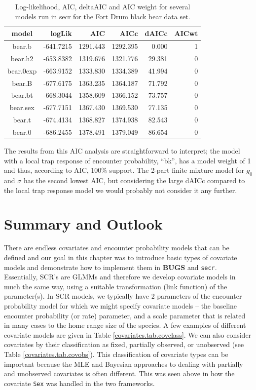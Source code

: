 \begin{table}[ht]
\centering
\caption{Log-likelihood, AIC, deltaAIC and AIC weight for several models run in secr for the Fort Drum black bear data set.}
\begin{tabular}{crrrrr}
\hline \hline
model     &  logLik   &   AIC    &   AICc   & dAICc  & AICwt \\ \hline
bear.b    & -641.7215 & 1291.443 & 1292.395 & 0.000  &  1 \\
bear.h2   & -653.8382 & 1319.676 & 1321.776 & 29.381 &  0 \\
bear.0exp & -663.9152 & 1333.830 & 1334.389 & 41.994 &  0 \\
bear.B    & -677.6175 & 1363.235 & 1364.187 & 71.792 &  0 \\
bear.bt   & -668.3044 & 1358.609 & 1366.152 & 73.757 &  0 \\
bear.sex  & -677.7151 & 1367.430 & 1369.530 & 77.135 &  0 \\
bear.t    & -674.4134 & 1368.827 & 1374.938 & 82.543 &  0 \\
bear.0    & -686.2455 & 1378.491 & 1379.049 & 86.654 &  0 \\ \hline
\end{tabular}
\label{covariates.tab.secrAIC}
\end{table}


The results from this AIC analysis are straightforward to interpret; the model
with a local trap response of encounter probability, ``bk'', has a model weight of 1 and thus, according to AIC, 100\% support.
The 2-part finite mixture model for $g_0$ and $\sigma$ has the second lowest
AIC, but considering the large dAICc compared to the local trap response model we would probably not consider it any further.  


\section{Summary and Outlook}

There are endless covariates and encounter probability models that can
be defined and our goal in this chapter was to introduce basic types
of covariate models and demonstrate how to implement them in {\bf
  BUGS} and \mbox{\tt secr}.  Essentially, SCR's are GLMMs and
therefore we develop covariate models in much the same way, using a
suitable transformation (link function) of the parameter(s). In SCR
models, we typically have 2 parameters of the encounter probability
model for which we might specify covariate models -- the baseline
encounter probability (or rate) parameter, and a scale parameter that
is related in many cases to the home range size of the species.  A few
examples of different covariate models are given in Table
\ref{covariates.tab.covclass}.  We can also consider covariates by
their classification as fixed, partially observed, or unobserved (see
Table \ref{covariates.tab.covobs}). This classification of covariate
types can be important because the MLE and Bayesian approaches to
dealing with partially and unobserved covariates is often different.
This was seen above in how the covariate \mbox{\tt Sex} was handled in
the two frameworks.

